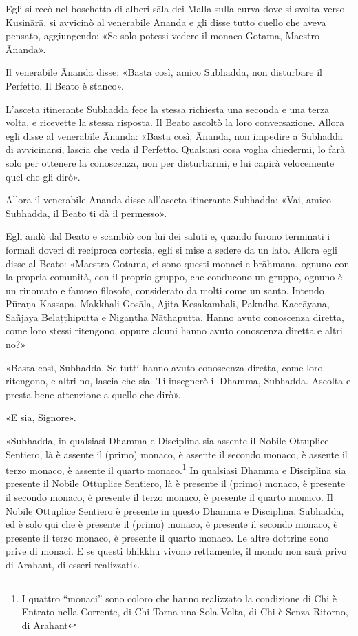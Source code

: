 Egli si recò nel boschetto di alberi sāla dei Malla sulla curva dove si svolta
verso Kusinārā, si avvicinò al venerabile Ānanda e gli disse tutto quello che
aveva pensato, aggiungendo: «Se solo potessi vedere il monaco Gotama, Maestro
Ānanda».

Il venerabile Ānanda disse: «Basta così, amico Subhadda, non disturbare il
Perfetto. Il Beato è stanco».

L’asceta itinerante Subhadda fece la stessa richiesta una seconda e una terza
volta, e ricevette la stessa risposta. Il Beato ascoltò la loro conversazione.
Allora egli disse al venerabile Ānanda: «Basta così, Ānanda, non impedire a
Subhadda di avvicinarsi, lascia che veda il Perfetto. Qualsiasi cosa voglia
chiedermi, lo farà solo per ottenere la conoscenza, non per disturbarmi, e lui
capirà velocemente quel che gli dirò».

Allora il venerabile Ānanda disse all’asceta itinerante Subhadda: «Vai, amico
Subhadda, il Beato ti dà il permesso».

Egli andò dal Beato e scambiò con lui dei saluti e, quando furono terminati i
formali doveri di reciproca cortesia, egli si mise a sedere da un lato. Allora
egli disse al Beato: «Maestro Gotama, ci sono questi monaci e brāhmaṇa, ognuno
con la propria comunità, con il proprio gruppo, che conducono un gruppo, ognuno
è un rinomato e famoso filosofo, considerato da molti come un santo. Intendo
Pūraṇa Kassapa, Makkhali Gosāla, Ajita Kesakambali, Pakudha Kaccāyana, Sañjaya
Belaṭṭhiputta e Nigaṇṭha Nāthaputta. Hanno avuto conoscenza diretta, come loro
stessi ritengono, oppure alcuni hanno avuto conoscenza diretta e altri no?»

«Basta così, Subhadda. Se tutti hanno avuto conoscenza diretta, come loro
ritengono, e altri no, lascia che sia. Ti insegnerò il Dhamma, Subhadda. Ascolta
e presta bene attenzione a quello che dirò».

«E sia, Signore».

«Subhadda, in qualsiasi Dhamma e Disciplina sia assente il Nobile Ottuplice
Sentiero, là è assente il (primo) monaco, è assente il secondo monaco, è assente
il terzo monaco, è assente il quarto monaco.\footnote{I quattro “monaci” sono
  coloro che hanno realizzato la condizione di Chi è Entrato nella Corrente, di
  Chi Torna una Sola Volta, di Chi è Senza Ritorno, di Arahant} In qualsiasi
Dhamma e Disciplina sia presente il Nobile Ottuplice Sentiero, là è presente il
(primo) monaco, è presente il secondo monaco, è presente il terzo monaco, è
presente il quarto monaco. Il Nobile Ottuplice Sentiero è presente in questo
Dhamma e Disciplina, Subhadda, ed è solo qui che è presente il (primo) monaco, è
presente il secondo monaco, è presente il terzo monaco, è presente il quarto
monaco. Le altre dottrine sono prive di monaci. E se questi bhikkhu vivono
rettamente, il mondo non sarà privo di Arahant, di esseri realizzati».

